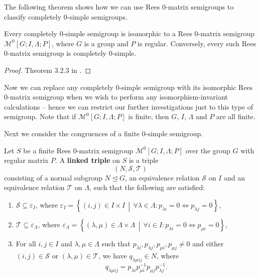 The following theorem shows how we can use Rees 0-matrix semigroups to classify
completely 0-simple semigroups.

\begin{theorem}[Rees]
  \label{thm:rees}
  Every completely 0-simple semigroup is isomorphic to a Rees 0-matrix semigroup
  $\mathcal{M}^0[G;I,\Lambda;P]$, where $G$ is a group and $P$ is regular.
  Conversely, every such Rees 0-matrix semigroup is completely 0-simple.
  \begin{proof}
    Theorem 3.2.3 in \cite{howie}.
  \end{proof}
\end{theorem}

Now we can replace any completely 0-simple semigroup with its isomorphic Rees
0-matrix semigroup when we wish to perform any isomorphism-invariant
calculations -- hence we can restrict our further investigations just to this
type of semigroup.  Note that if $\mathcal{M}^0[G;I,\Lambda;P]$ is finite, then
$G$, $I$, $\Lambda$ and $P$ are all finite.

Next we consider the congruences of a finite 0-simple semigroup.

\begin{definition}
  \label{def:linked-triple}
  Let $S$ be a finite Rees 0-matrix semigroup $\mathcal{M}^0[G;I,\Lambda;P]$
  over the group $G$ with regular matrix $P$.  A \textbf{linked triple} on $S$
  is a triple $$(N,\mathcal{S},\mathcal{T})$$ consisting of a normal subgroup
  $N \trianglelefteq G$, an equivalence relation $\mathcal{S}$ on $I$ and an
  equivalence relation $\mathcal{T}$ on $\Lambda$, such that the following are
  satisfied:
  \begin{enumerate}[\rm(1)]
  \item $\mathcal{S} \subseteq \varepsilon_I$, where $\varepsilon_I =
    \left\{(i,j) \in I \times I\, \middle|\, \forall \lambda \in \Lambda:
      p_{\lambda i}=0 \iff p_{\lambda j}=0 \right\}$,
  \item $\mathcal{T} \subseteq \varepsilon_\Lambda$, where $\varepsilon_\Lambda
    = \left\{(\lambda,\mu) \in \Lambda \times \Lambda\, \middle|\, \forall i \in
      I: p_{\lambda i}=0 \iff p_{\mu i}=0 \right\}$,
  \item For all $i,j \in I$ and $\lambda, \mu \in \Lambda$ such that
    $p_{\lambda i}, p_{\lambda j}, p_{\mu i}, p_{\mu j} \neq 0$ and either
    $(i,j) \in \mathcal{S}$ or $(\lambda,\mu) \in \mathcal{T}$, we have
    $q_{\lambda \mu i j} \in N$, where
    $$q_{\lambda \mu i j} = p_{\lambda i} p_{\mu i}^{-1} p_{\mu j} p_{\lambda
      j}^{-1}.$$
  \end{enumerate}
  \cite[\S 3.5]{howie}
\end{definition}

